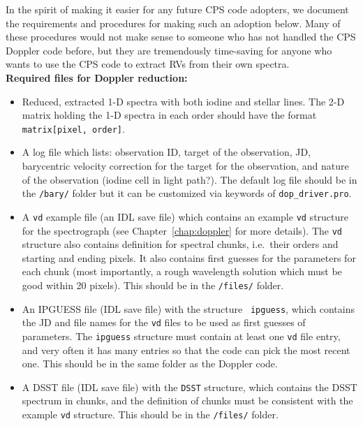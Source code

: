In the spirit of making it easier for any future CPS code adopters, we
document the requirements and procedures for making such an adoption
below. Many of these procedures would not make sense to someone who
has not handled the CPS Doppler code before, but they are tremendously
time-saving for anyone who wants to use the CPS code to extract RVs
from their own spectra.\\

{\bf Required files for Doppler reduction:}
\begin{itemize}
\item Reduced, extracted 1-D spectra with both iodine and stellar
  lines. The 2-D matrix holding the 1-D spectra in each order should
  have the format {\tt matrix[pixel, order]}.
\item A log file which lists: observation ID, target of the
  observation, JD, barycentric velocity correction for the target for
  the observation, and nature of the observation (iodine cell in light
  path?). The default log file should be in the {\tt /bary/} folder but
  it can be customized via keywords of {\tt dop\_driver.pro}.
\item A {\tt vd} example file (an IDL save file) which contains an
  example {\tt vd} structure for the spectrograph (see
  Chapter~\ref{chap:doppler} for more details). The {\tt vd} structure
  also contains definition for spectral chunks, i.e.\ their orders and
  starting and ending pixels. It also contains first guesses for the
  parameters for each chunk (most importantly, a rough wavelength
  solution which must be good within 20 pixels). This should be in the
  {\tt /files/} folder.
\item An IPGUESS file (IDL save file) with the structure {\tt
    ipguess}, which contains the JD and file names for the {\tt vd} files
  to be used as first guesses of parameters. The {\tt ipguess} structure
  must contain at least one {\tt vd} file entry, and very often it has
  many entries so that the code can pick the most recent one. This
  should be in the same folder as the Doppler code.
\item A DSST file (IDL save file) with the {\tt DSST} structure, which
  contains the DSST spectrum in chunks, and the definition of chunks
  must be consistent with the example {\tt vd} structure. This should be
  in the {\tt /files/} folder.
\end{itemize}

